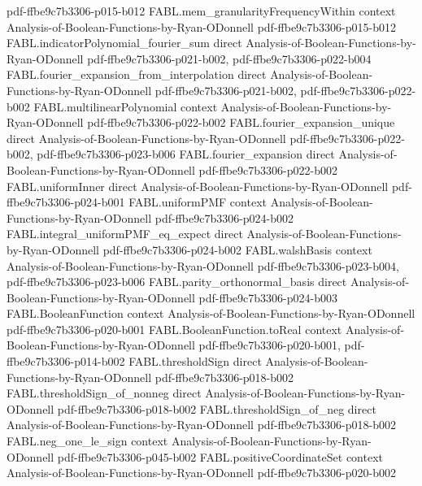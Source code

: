 \begin{theorem}
  {pdf-ffbe9c7b3306-p015-b012}
\proofstep
  {FABL.mem_granularityFrequencyWithin}
  {context}
  {Analysis-of-Boolean-Functions-by-Ryan-ODonnell}
  {pdf-ffbe9c7b3306-p015-b012}
\proofstep
  {FABL.indicatorPolynomial_fourier_sum}
  {direct}
  {Analysis-of-Boolean-Functions-by-Ryan-ODonnell}
  {pdf-ffbe9c7b3306-p021-b002,
    pdf-ffbe9c7b3306-p022-b004}
\proofstep
  {FABL.fourier_expansion_from_interpolation}
  {direct}
  {Analysis-of-Boolean-Functions-by-Ryan-ODonnell}
  {pdf-ffbe9c7b3306-p021-b002,
    pdf-ffbe9c7b3306-p022-b002}
\proofstep
  {FABL.multilinearPolynomial}
  {context}
  {Analysis-of-Boolean-Functions-by-Ryan-ODonnell}
  {pdf-ffbe9c7b3306-p022-b002}
\proofstep
  {FABL.fourier_expansion_unique}
  {direct}
  {Analysis-of-Boolean-Functions-by-Ryan-ODonnell}
  {pdf-ffbe9c7b3306-p022-b002,
    pdf-ffbe9c7b3306-p023-b006}
\proofstep
  {FABL.fourier_expansion}
  {direct}
  {Analysis-of-Boolean-Functions-by-Ryan-ODonnell}
  {pdf-ffbe9c7b3306-p022-b002}
\proofstep
  {FABL.uniformInner}
  {direct}
  {Analysis-of-Boolean-Functions-by-Ryan-ODonnell}
  {pdf-ffbe9c7b3306-p024-b001}
\proofstep
  {FABL.uniformPMF}
  {context}
  {Analysis-of-Boolean-Functions-by-Ryan-ODonnell}
  {pdf-ffbe9c7b3306-p024-b002}
\proofstep
  {FABL.integral_uniformPMF_eq_expect}
  {direct}
  {Analysis-of-Boolean-Functions-by-Ryan-ODonnell}
  {pdf-ffbe9c7b3306-p024-b002}
\proofstep
  {FABL.walshBasis}
  {context}
  {Analysis-of-Boolean-Functions-by-Ryan-ODonnell}
  {pdf-ffbe9c7b3306-p023-b004,
    pdf-ffbe9c7b3306-p023-b006}
\proofstep
  {FABL.parity_orthonormal_basis}
  {direct}
  {Analysis-of-Boolean-Functions-by-Ryan-ODonnell}
  {pdf-ffbe9c7b3306-p024-b003}
\proofstep
  {FABL.BooleanFunction}
  {context}
  {Analysis-of-Boolean-Functions-by-Ryan-ODonnell}
  {pdf-ffbe9c7b3306-p020-b001}
\proofstep
  {FABL.BooleanFunction.toReal}
  {context}
  {Analysis-of-Boolean-Functions-by-Ryan-ODonnell}
  {pdf-ffbe9c7b3306-p020-b001,
    pdf-ffbe9c7b3306-p014-b002}
\proofstep
  {FABL.thresholdSign}
  {direct}
  {Analysis-of-Boolean-Functions-by-Ryan-ODonnell}
  {pdf-ffbe9c7b3306-p018-b002}
\proofstep
  {FABL.thresholdSign_of_nonneg}
  {direct}
  {Analysis-of-Boolean-Functions-by-Ryan-ODonnell}
  {pdf-ffbe9c7b3306-p018-b002}
\proofstep
  {FABL.thresholdSign_of_neg}
  {direct}
  {Analysis-of-Boolean-Functions-by-Ryan-ODonnell}
  {pdf-ffbe9c7b3306-p018-b002}
\proofstep
  {FABL.neg_one_le_sign}
  {context}
  {Analysis-of-Boolean-Functions-by-Ryan-ODonnell}
  {pdf-ffbe9c7b3306-p045-b002}
\proofstep
  {FABL.positiveCoordinateSet}
  {context}
  {Analysis-of-Boolean-Functions-by-Ryan-ODonnell}
  {pdf-ffbe9c7b3306-p020-b002}

\end{theorem}
